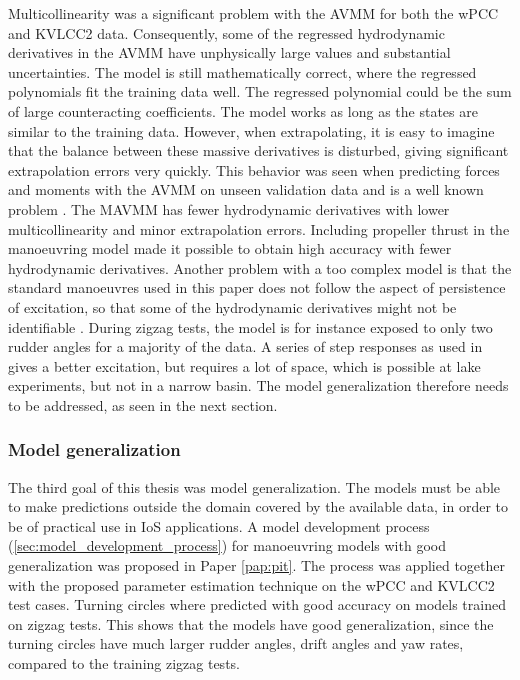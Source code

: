 Multicollinearity was a significant problem with the AVMM for both the wPCC and KVLCC2 data. Consequently, some of the regressed hydrodynamic derivatives in the AVMM have unphysically large values and substantial uncertainties. The model is still mathematically correct, where the regressed polynomials fit the training data well. The regressed polynomial could be the sum of large counteracting coefficients. The model works as long as the states are similar to the training data. However, when extrapolating, it is easy to imagine that the balance between these massive derivatives is disturbed, giving significant extrapolation errors very quickly. This behavior was seen when predicting forces and moments with the AVMM on unseen validation data and is a well known problem \cite{ittc_maneuvering_2008}.
The MAVMM has fewer hydrodynamic derivatives with lower multicollinearity and minor extrapolation errors. Including propeller thrust in the manoeuvring model made it possible to obtain high accuracy with fewer hydrodynamic derivatives. Another problem with a too complex model is that the standard manoeuvres used in this paper does not follow the aspect of persistence of excitation, so that some of the hydrodynamic derivatives might not be identifiable \cite{revestido_herrero_two-step_2012}. During zigzag tests, the model is for instance exposed to only two rudder angles for a majority of the data. A series of step responses as used in \cite{miller_ship_2021} gives a better excitation, but requires a lot of space, which is possible at lake experiments, but not in a narrow basin. The model generalization therefore needs to be addressed, as seen in the next section.

\subsubsection*{Model generalization} 
The third goal of this thesis was model generalization. The models must be able to make predictions outside the domain covered by the available data, in order to be of practical use in IoS applications. A model development process (\autoref{sec:model_development_process}) for manoeuvring models with good generalization was proposed in Paper \ref{pap:pit}.
The process was applied together with the proposed parameter estimation technique on the wPCC and KVLCC2 test cases. Turning circles where predicted with good accuracy on models trained on zigzag tests. This shows that the models have good generalization, since the turning circles have much larger rudder angles, drift angles and yaw rates, compared to the training zigzag tests. 
